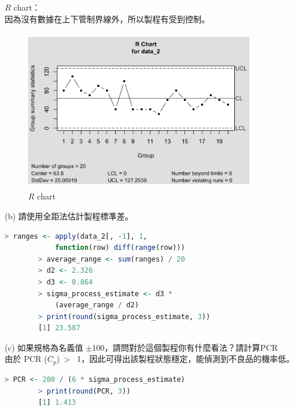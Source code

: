             
    $R$ chart：\\
    因為沒有數據在上下管制界線外，所以製程有受到控制。
        \begin{figure}[ht]
            \centering
            \includegraphics[width=10cm, height=7cm]{figures/R_Chart_2.png}
            \caption{$R$ chart}
            \label{fig:4}
        \end{figure}

(b) 請使用全距法估計製程標準差。
    \begin{lstlisting}[language=R]
        > ranges <- apply(data_2[, -1], 1, 
            function(row) diff(range(row)))
        > average_range <- sum(ranges) / 20
        > d2 <- 2.326
        > d3 <- 0.864
        > sigma_process_estimate <- d3 * 
            (average_range / d2)
        > print(round(sigma_process_estimate, 3))
        [1] 23.587
    \end{lstlisting}
    
(c) 如果規格為名義值 $\pm$100，請問對於這個製程你有什麼看法？請計算PCR\\
    由於 PCR ($C_p$)\ > \ 1，因此可得出該製程狀態穩定，能偵測到不良品的機率低。
    \begin{lstlisting}[language=R]
        > PCR <- 200 / (6 * sigma_process_estimate)
        > print(round(PCR, 3))
        [1] 1.413
    \end{lstlisting}
